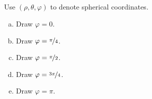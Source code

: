


\subsection*{\Conceptual}

\begin{question}
Use $(\rho,\theta,\varphi)$ to denote spherical coordinates.
\begin{enumerate}[(a)]
\item
Draw $\varphi=0$.
\item
Draw $\varphi=\nicefrac{\pi}{4}$.
\item 
Draw $\varphi=\nicefrac{\pi}{2}$.
\item
Draw $\varphi=\nicefrac{3\pi}{4}$.
\item
Draw $\varphi=\pi$.
\end{enumerate}

\end{question}

%

